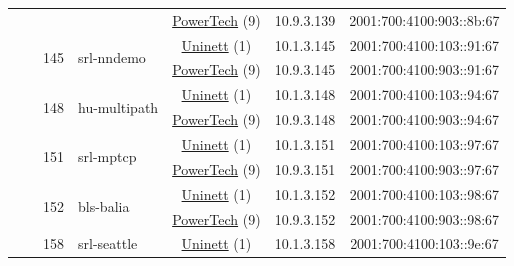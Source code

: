 \begin{small}
\begin{center}
\begin{longtable}{|c|c|c|c|c|c|c|c|}
  &  &  &  & \multicolumn{2}{|c|}{\tiny{\href{http://www.powertech.no}{PowerTech} (9)}} & \tiny{10.9.3.139} & \tiny{2001:700:4100:903::8b:67} \\* \cline{3-3}\cline{4-4}\cline{5-5}\cline{6-6}\cline{7-7}\cline{8-8}
  &  & \multirow{2}{*}{\tiny{145}} & \multicolumn{1}{|l|}{\multirow{2}{*}{\tiny{srl-nndemo}}} & \multicolumn{2}{|c|}{\tiny{\href{https://www.uninett.no}{Uninett} (1)}} & \tiny{10.1.3.145} & \tiny{2001:700:4100:103::91:67} \\* \cline{5-5}\cline{6-6}\cline{7-7}\cline{8-8}
  &  &  &  & \multicolumn{2}{|c|}{\tiny{\href{http://www.powertech.no}{PowerTech} (9)}} & \tiny{10.9.3.145} & \tiny{2001:700:4100:903::91:67} \\* \cline{3-3}\cline{4-4}\cline{5-5}\cline{6-6}\cline{7-7}\cline{8-8}
  &  & \multirow{2}{*}{\tiny{148}} & \multicolumn{1}{|l|}{\multirow{2}{*}{\tiny{hu-multipath}}} & \multicolumn{2}{|c|}{\tiny{\href{https://www.uninett.no}{Uninett} (1)}} & \tiny{10.1.3.148} & \tiny{2001:700:4100:103::94:67} \\* \cline{5-5}\cline{6-6}\cline{7-7}\cline{8-8}
  &  &  &  & \multicolumn{2}{|c|}{\tiny{\href{http://www.powertech.no}{PowerTech} (9)}} & \tiny{10.9.3.148} & \tiny{2001:700:4100:903::94:67} \\* \cline{3-3}\cline{4-4}\cline{5-5}\cline{6-6}\cline{7-7}\cline{8-8}
  &  & \multirow{2}{*}{\tiny{151}} & \multicolumn{1}{|l|}{\multirow{2}{*}{\tiny{srl-mptcp}}} & \multicolumn{2}{|c|}{\tiny{\href{https://www.uninett.no}{Uninett} (1)}} & \tiny{10.1.3.151} & \tiny{2001:700:4100:103::97:67} \\* \cline{5-5}\cline{6-6}\cline{7-7}\cline{8-8}
  &  &  &  & \multicolumn{2}{|c|}{\tiny{\href{http://www.powertech.no}{PowerTech} (9)}} & \tiny{10.9.3.151} & \tiny{2001:700:4100:903::97:67} \\* \cline{3-3}\cline{4-4}\cline{5-5}\cline{6-6}\cline{7-7}\cline{8-8}
  &  & \multirow{2}{*}{\tiny{152}} & \multicolumn{1}{|l|}{\multirow{2}{*}{\tiny{bls-balia}}} & \multicolumn{2}{|c|}{\tiny{\href{https://www.uninett.no}{Uninett} (1)}} & \tiny{10.1.3.152} & \tiny{2001:700:4100:103::98:67} \\* \cline{5-5}\cline{6-6}\cline{7-7}\cline{8-8}
  &  &  &  & \multicolumn{2}{|c|}{\tiny{\href{http://www.powertech.no}{PowerTech} (9)}} & \tiny{10.9.3.152} & \tiny{2001:700:4100:903::98:67} \\* \cline{3-3}\cline{4-4}\cline{5-5}\cline{6-6}\cline{7-7}\cline{8-8}
  &  & \multirow{2}{*}{\tiny{158}} & \multicolumn{1}{|l|}{\multirow{2}{*}{\tiny{srl-seattle}}} & \multicolumn{2}{|c|}{\tiny{\href{https://www.uninett.no}{Uninett} (1)}} & \tiny{10.1.3.158} & \tiny{2001:700:4100:103::9e:67} \\* \cline{5-5}\cline{6-6}\cline{7-7}\cline{8-8}

\end{longtable}
\end{center}
\end{small}
